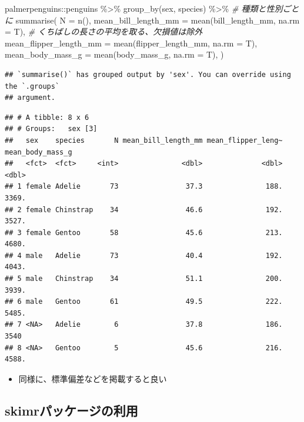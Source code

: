 \documentclass[
]{ltjsarticle}
\newenvironment{Shaded}{\begin{snugshade}}{\end{snugshade}}
\newcommand{\AttributeTok}[1]{\textcolor[rgb]{0.77,0.63,0.00}{#1}}
\newcommand{\CommentTok}[1]{\textcolor[rgb]{0.56,0.35,0.01}{\textit{#1}}}
\newcommand{\FunctionTok}[1]{\textcolor[rgb]{0.00,0.00,0.00}{#1}}
\newcommand{\NormalTok}[1]{#1}
\newcommand{\SpecialCharTok}[1]{\textcolor[rgb]{0.00,0.00,0.00}{#1}}
\providecommand{\tightlist}{%
  \setlength{\itemsep}{0pt}\setlength{\parskip}{0pt}}
\begin{document}
\begin{Shaded}
\begin{Highlighting}[]
\NormalTok{palmerpenguins}\SpecialCharTok{::}\NormalTok{penguins }\SpecialCharTok{\%\textgreater{}\%}
  \FunctionTok{group\_by}\NormalTok{(sex, species) }\SpecialCharTok{\%\textgreater{}\%} \CommentTok{\# 種類と性別ごとに}
  \FunctionTok{summarise}\NormalTok{(}
    \AttributeTok{N =} \FunctionTok{n}\NormalTok{(),}
    \AttributeTok{mean\_bill\_length\_mm =} \FunctionTok{mean}\NormalTok{(bill\_length\_mm, }\AttributeTok{na.rm =}\NormalTok{ T), }\CommentTok{\# くちばしの長さの平均を取る、欠損値は除外}
    \AttributeTok{mean\_flipper\_length\_mm =} \FunctionTok{mean}\NormalTok{(flipper\_length\_mm, }\AttributeTok{na.rm =}\NormalTok{ T),}
    \AttributeTok{mean\_body\_mass\_g =} \FunctionTok{mean}\NormalTok{(body\_mass\_g, }\AttributeTok{na.rm =}\NormalTok{ T),}
\NormalTok{  )}
\end{Highlighting}
\end{Shaded}

\begin{verbatim}
## `summarise()` has grouped output by 'sex'. You can override using the `.groups`
## argument.
\end{verbatim}

\begin{verbatim}
## # A tibble: 8 x 6
## # Groups:   sex [3]
##   sex    species       N mean_bill_length_mm mean_flipper_leng~ mean_body_mass_g
##   <fct>  <fct>     <int>               <dbl>              <dbl>            <dbl>
## 1 female Adelie       73                37.3               188.            3369.
## 2 female Chinstrap    34                46.6               192.            3527.
## 3 female Gentoo       58                45.6               213.            4680.
## 4 male   Adelie       73                40.4               192.            4043.
## 5 male   Chinstrap    34                51.1               200.            3939.
## 6 male   Gentoo       61                49.5               222.            5485.
## 7 <NA>   Adelie        6                37.8               186.            3540 
## 8 <NA>   Gentoo        5                45.6               216.            4588.
\end{verbatim}

\begin{itemize}
\tightlist
\item
  同様に、標準偏差などを掲載すると良い
\end{itemize}

\hypertarget{skimrux30d1ux30c3ux30b1ux30fcux30b8ux306eux5229ux7528}{%
\subsection{skimrパッケージの利用}\label{skimrux30d1ux30c3ux30b1ux30fcux30b8ux306eux5229ux7528}}
\end{document}
